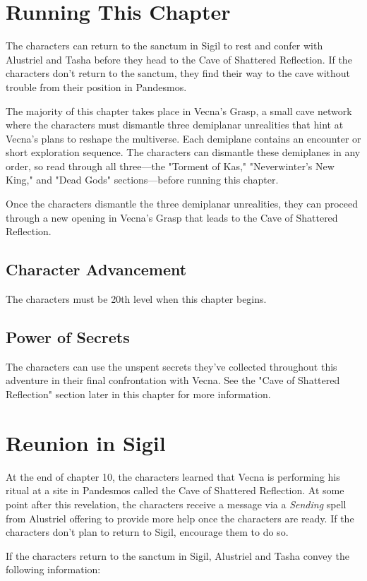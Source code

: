 \documentclass[10pt,a4paper,twoside,bg=print,twocolumn,openany,nodeprecatedcode]{dndbook}
\begin{document}
\section{Running This Chapter}
The characters can return to the sanctum in Sigil to rest and confer with Alustriel and Tasha before they head to the Cave of Shattered Reflection. If the characters don't return to the sanctum, they find their way to the cave without trouble from their position in Pandesmos.

The majority of this chapter takes place in Vecna's Grasp, a small cave network where the characters must dismantle three demiplanar unrealities that hint at Vecna's plans to reshape the multiverse. Each demiplane contains an encounter or short exploration sequence. The characters can dismantle these demiplanes in any order, so read through all three—the "Torment of Kas," "Neverwinter's New King," and "Dead Gods" sections—before running this chapter.

Once the characters dismantle the three demiplanar unrealities, they can proceed through a new opening in Vecna's Grasp that leads to the Cave of Shattered Reflection.

\subsection{Character Advancement}
The characters must be 20th level when this chapter begins.

\subsection{Power of Secrets}
The characters can use the unspent secrets they've collected throughout this adventure in their final confrontation with Vecna. See the "Cave of Shattered Reflection" section later in this chapter for more information.

\section{Reunion in Sigil}
At the end of chapter 10, the characters learned that Vecna is performing his ritual at a site in Pandesmos called the Cave of Shattered Reflection. At some point after this revelation, the characters receive a message via a \textit{Sending} spell from Alustriel offering to provide more help once the characters are ready. If the characters don't plan to return to Sigil, encourage them to do so.

If the characters return to the sanctum in Sigil, Alustriel and Tasha convey the following information:
\end{document}
